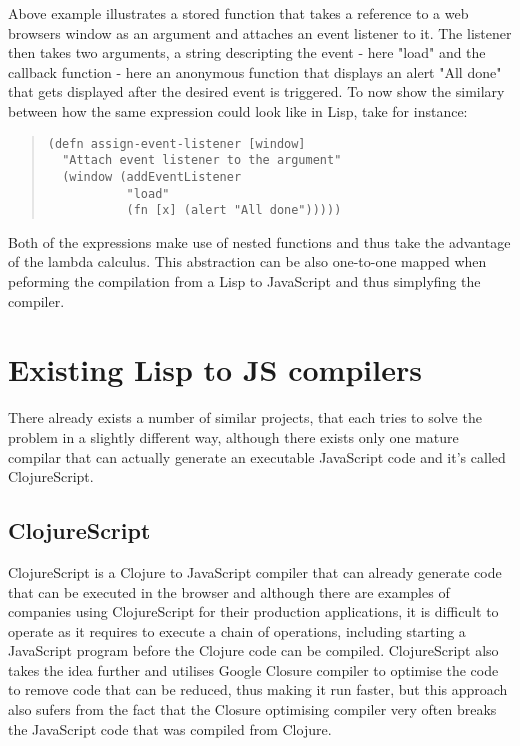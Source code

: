 Above example illustrates a stored function that takes a reference to a web browsers window as an argument and attaches an event listener to it. The listener then takes two arguments, a string descripting the event - here "load" and the callback function - here an anonymous function that displays an alert "All done" that gets displayed after the desired event is triggered.
To now show the similary between how the same expression could look like in Lisp, take for instance:

\begin{quote}
\begin{verbatim}
(defn assign-event-listener [window]
  "Attach event listener to the argument"
  (window (addEventListener
           "load"
           (fn [x] (alert "All done")))))
\end{verbatim}
\end{quote}

Both of the expressions make use of nested functions and thus take the advantage of the lambda calculus. This abstraction can be also one-to-one mapped when peforming the compilation from a Lisp to JavaScript and thus simplyfing the compiler.

\section{Existing Lisp to JS compilers}
There already exists a number of similar projects, that each tries to solve the problem in a slightly different way, although there exists only one mature compilar that can actually generate an executable JavaScript code and it's called ClojureScript.

\subsection{ClojureScript}
ClojureScript is a Clojure to JavaScript compiler that can already generate code that can be executed in the browser and although there are examples of companies using ClojureScript for their production applications, it is difficult to operate as it requires to execute a chain of operations, including starting a JavaScript program before the Clojure code can be compiled.
ClojureScript also takes the idea further and utilises Google Closure compiler to optimise the code to remove code that can be reduced, thus making it run faster, but this approach also sufers from the fact that the Closure optimising compiler very often breaks the JavaScript code that was compiled from Clojure.


